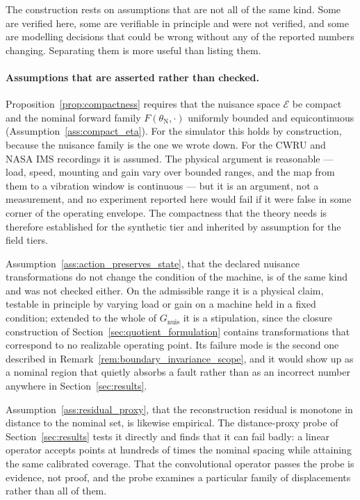 \documentclass[a4paper]{cas-sc}
\newcommand{\EtaSpace}{\ensuremath{\mathcal{E}}}
\newcommand{\Gnuis}{\ensuremath{G_{\mathrm{nuis}}}}
\begin{document}
The construction rests on assumptions that are not all of the same kind. Some
are verified here, some are verifiable in principle and were not verified, and
some are modelling decisions that could be wrong without any of the reported
numbers changing. Separating them is more useful than listing them.

\paragraph{Assumptions that are asserted rather than checked.}
Proposition~\ref{prop:compactness} requires that the nuisance space
\(\EtaSpace\) be compact and the nominal forward family
\(F(\theta_{\mathrm{N}},\cdot)\) uniformly bounded and equicontinuous
(Assumption~\ref{ass:compact_eta}). For the simulator this holds by
construction, because the nuisance family is the one we wrote down. For the
CWRU and NASA IMS recordings it is assumed. The physical argument is
reasonable --- load, speed, mounting and gain vary over bounded ranges, and the
map from them to a vibration window is continuous --- but it is an argument,
not a measurement, and no experiment reported here would fail if it were
false in some corner of the operating envelope. The compactness that the
theory needs is therefore established for the synthetic tier and inherited by
assumption for the field tiers.

Assumption~\ref{ass:action_preserves_state}, that the declared nuisance
transformations do not change the condition of the machine, is of the same
kind and was not checked either. On the admissible range it is a physical
claim, testable in principle by varying load or gain on a machine held in a
fixed condition; extended to the whole of \(\Gnuis\) it is a stipulation,
since the closure construction of Section~\ref{sec:quotient_formulation}
contains transformations that correspond to no realizable operating point. Its
failure mode is the second one described in
Remark~\ref{rem:boundary_invariance_scope}, and it would show up as a nominal
region that quietly absorbs a fault rather than as an incorrect number
anywhere in Section~\ref{sec:results}.

Assumption~\ref{ass:residual_proxy}, that the reconstruction residual is
monotone in distance to the nominal set, is likewise empirical. The
distance-proxy probe of Section~\ref{sec:results} tests it directly and finds
that it can fail badly: a linear operator accepts points at hundreds of times
the nominal spacing while attaining the same calibrated coverage. That the
convolutional operator passes the probe is evidence, not proof, and the probe
examines a particular family of displacements rather than all of them.
\end{document}

